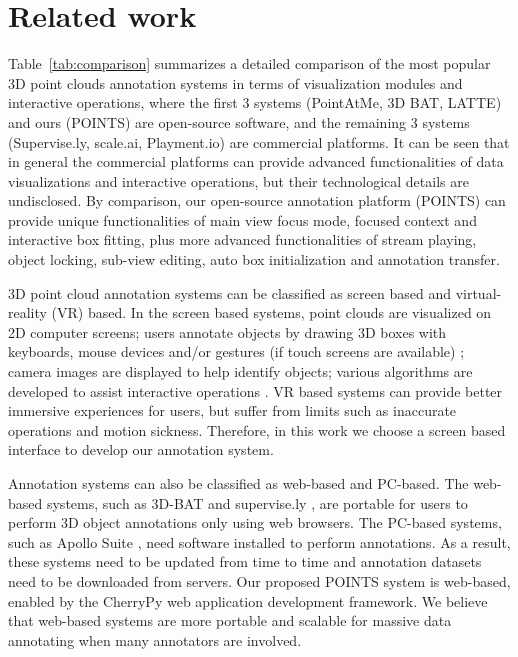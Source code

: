 \documentclass[letterpaper, 10 pt, conference]{ieeeconf}  %
\begin{document}
\section{Related work}
\label{sec:realtedwork}



Table~\ref{tab:comparison} summarizes a detailed comparison of the most popular 3D point clouds annotation systems in terms of visualization modules and interactive operations, where the first 3 systems (PointAtMe\cite{pointatme}, 3D BAT\cite{Zimmer20193DBA}, LATTE\cite{Wang2019LATTEAL}) and ours (POINTS) are open-source software, 
and the remaining 3 systems (Supervise.ly\cite{SUPERVISELY}, scale.ai\cite{scale}, Playment.io\cite{Playment}) are commercial platforms. 
It can be seen that in general the commercial platforms can provide advanced functionalities of data visualizations and interactive operations, 
but their technological details are undisclosed. 
By comparison, our open-source annotation platform (POINTS) can provide unique functionalities of main view focus mode, focused context and interactive box fitting, plus more advanced functionalities of stream playing, object locking, sub-view editing, auto box initialization and annotation transfer.

3D point cloud annotation systems can be classified as screen based and virtual-reality (VR) based. 
In the screen based systems, point clouds are visualized on 2D computer screens; users annotate objects by drawing 3D boxes with
keyboards, mouse devices and/or gestures (if touch screens are available) \cite{LabelMe3D}; camera images are displayed to help identify objects; various algorithms are developed to assist interactive operations \cite{Wang2019LATTEAL}. 
VR based systems can provide better immersive experiences for users\cite{pointatme, gothentag}, but suffer from limits such as inaccurate operations and motion sickness. 
Therefore, in this work we choose a screen based interface to develop our annotation system.

Annotation systems can also be classified as web-based and PC-based. 
The web-based systems, such as 3D-BAT\cite{Zimmer20193DBA} and supervise.ly \cite{SUPERVISELY}, are portable for users to perform 3D object annotations only using web browsers. 
The PC-based systems, such as Apollo Suite \cite{wang2019apolloscape}, need software installed to perform annotations. 
As a result, these systems need to be updated from time to time and annotation datasets need to be downloaded from servers. 
Our proposed POINTS system is web-based, enabled by the CherryPy \cite{cherrypy} web application development framework. 
We believe that web-based systems are more portable and scalable for massive data annotating when many annotators are involved.
\end{document}
